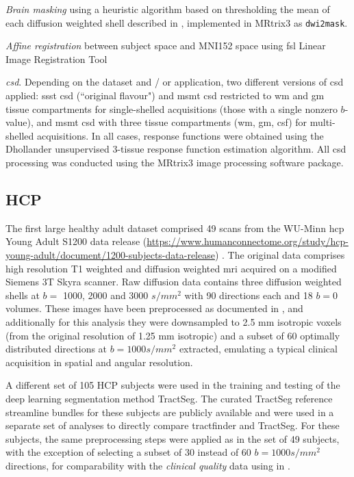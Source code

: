 \textit{Brain masking}\autocite{Tournier2019}
using a heuristic algorithm based on thresholding the mean of each diffusion weighted shell described in \textcite{Dhollander2016}, implemented in MRtrix3\autocite{Tournier2019} as \verb|dwi2mask|.

\textit{Affine registration} between subject space and MNI152\autocite{Fonov2011} space using \gls{fsl} Linear Image Registration Tool\autocite{Jenkinson2001,Jenkinson2002}

\textit{\Gls{csd}}. Depending on the dataset and / or application, two different versions of \gls{csd} applied: \gls{ssst} \gls{csd} (``original flavour")\autocite{Tournier2007,Tournier2019} and \gls{msmt} \gls{csd}\autocite{Jeurissen2014} restricted to \gls{wm} and \gls{gm} tissue compartments for single-shelled acquisitions (those with a single nonzero $b$-value),
and \gls{msmt} \gls{csd} with three tissue compartments (\gls{wm}, \gls{gm}, \gls{csf}) for multi-shelled acquisitions.
In all cases, response functions were obtained using the Dhollander unsupervised 3-tissue response function estimation algorithm.\autocite{Dhollander2016,Dhollander2019}
All \gls{csd} processing was conducted using the MRtrix3 image processing software package\autocite{Tournier2019}.

\subsection{HCP}

The first large healthy adult dataset comprised 49 scans from the WU-Minn \gls{hcp} Young Adult S1200 data release (\url{https://www.humanconnectome.org/study/hcp-young-adult/document/1200-subjects-data-release}) \autocite{VanEssen2013}.
The original data comprises high resolution T1 weighted and diffusion weighted \gls{mri} acquired on a modified Siemens 3T Skyra scanner.
Raw diffusion data contains three diffusion weighted shells at $b=$ 1000, 2000 and 3000 $s/mm^2$ with 90 directions each and 18 $b=0$ volumes.\autocite{Sotiropoulos2013}
These images have been preprocessed as documented in \textcite{Glasser2013,Sotiropoulos2013},
and additionally for this analysis they were downsampled to 2.5 mm isotropic voxels (from the original resolution of 1.25 mm isotropic) and a subset of 60 optimally distributed directions at $b=1000 s/mm^2$ extracted, emulating a typical clinical acquisition in spatial and angular resolution.

A different set of 105 HCP subjects were used in the training and testing of the deep learning segmentation method TractSeg.\autocite{Wasserthal2018}
The curated TractSeg reference streamline bundles for these subjects are publicly available\autocite{Wasserthal2018b} and were used in a separate set of analyses to directly compare tractfinder and TractSeg.
For these subjects, the same preprocessing steps were applied as in the set of 49 subjects, with the exception of selecting a subset of 30 instead of 60 $b=1000s/mm^2$ directions, for comparability with the \textit{clinical quality} data using in \textcite{Wasserthal2018}.

